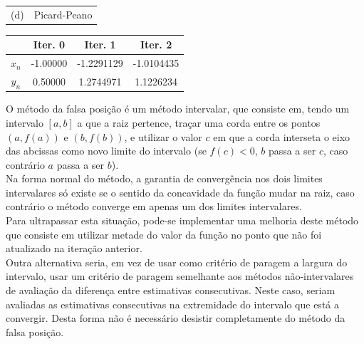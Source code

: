 {\begin{center}
\begin{tabular}{r | l}
	(d) & Picard-Peano
\end{tabular} \end{center}

\begin{center} \begin{tabular}{c | c c c}
	& Iter. 0 & Iter. 1 & Iter. 2\\ \hline
	$x_n$ & -1.00000 & -1.2291129 & -1.0104435 \\
	$y_n$ & 0.50000 & 1.2744971 & 1.1226234
\end{tabular} \end{center}
O método da falsa posição é um método intervalar, que consiste em, tendo um intervalo $[a,b]$ a que a raiz pertence, traçar uma corda entre os pontos $(a, f(a))$ e $(b, f(b))$, e utilizar o valor $c$ em que a corda interseta o eixo das abcissas como novo limite do intervalo (se $f(c) < 0$, $b$ passa a ser $c$, caso contrário $a$ passa a ser $b$).\\
Na forma normal do método, a garantia de convergência nos dois limites intervalares só existe se o sentido da concavidade da função mudar na raiz, caso contrário o método converge em apenas um dos limites intervalares.\\
Para ultrapassar esta situação, pode-se implementar uma melhoria deste método que consiste em utilizar metade do valor da função no ponto que não foi atualizado na iteração anterior.\\
Outra alternativa seria, em vez de usar como critério de paragem a largura do intervalo, usar um critério de paragem semelhante aos métodos não-intervalares de avaliação da diferença entre estimativas consecutivas. Neste caso, seriam avaliadas as estimativas consecutivas na extremidade do intervalo que está a convergir. Desta forma não é necessário desistir completamente do método da falsa posição.
}